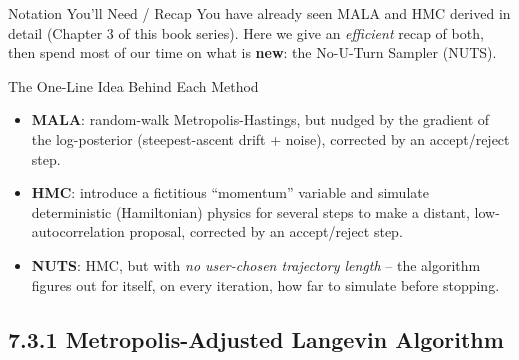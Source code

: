 \documentclass[aspectratio=169,10pt]{beamer}
\begin{document}
\begin{frame}{Notation You'll Need / Recap}
You have already seen MALA and HMC derived in detail (Chapter 3 of this book series). Here we give an \emph{efficient} recap of both, then spend most of our time on what is \textbf{new}: the No-U-Turn Sampler (NUTS).

\begin{block}{The One-Line Idea Behind Each Method}
\begin{itemize}
  \item \textbf{MALA}: random-walk Metropolis-Hastings, but nudged by the gradient of the log-posterior (steepest-ascent drift + noise), corrected by an accept/reject step.
  \item \textbf{HMC}: introduce a fictitious ``momentum'' variable and simulate deterministic (Hamiltonian) physics for several steps to make a distant, low-autocorrelation proposal, corrected by an accept/reject step.
  \item \textbf{NUTS}: HMC, but with \emph{no user-chosen trajectory length} -- the algorithm figures out for itself, on every iteration, how far to simulate before stopping.
\end{itemize}
\end{block}
\end{frame}

\subsection{7.3.1 Metropolis-Adjusted Langevin Algorithm}
\end{document}
